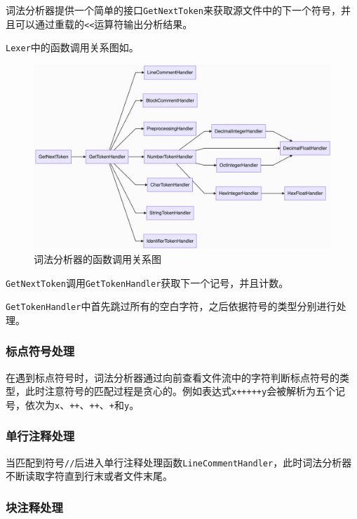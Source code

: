 \documentclass[lang=cn,11pt,a4paper,cite=authornum]{paper}
\begin{document}
词法分析器提供一个简单的接口\texttt{GetNextToken}来获取源文件中的下一个符号，并且可以通过重载的\texttt{<<}运算符输出分析结果。

\texttt{Lexer}中的函数调用关系图如。

\begin{figure}[htbp]

    \centering
    \includegraphics[width=0.9\linewidth]{./images/lexer.png}
    \caption{词法分析器的函数调用关系图\label{fig:lexer}}

\end{figure}

\texttt{GetNextToken}调用\texttt{GetTokenHandler}获取下一个记号，并且计数。

\texttt{GetTokenHandler}中首先跳过所有的空白字符，之后依据符号的类型分别进行处理。

\subsubsection{标点符号处理}

在遇到标点符号时，词法分析器通过向前查看文件流中的字符判断标点符号的类型，此时注意符号的匹配过程是贪心的。例如表达式\texttt{x+++++y}会被解析为五个记号，依次为\texttt{x}、\texttt{++}、\texttt{++}、\texttt{+}和\texttt{y}。

\subsubsection{单行注释处理}

当匹配到符号\texttt{//}后进入单行注释处理函数\texttt{LineCommentHandler}，此时词法分析器不断读取字符直到行末或者文件末尾。

\subsubsection{块注释处理}
\end{document}
